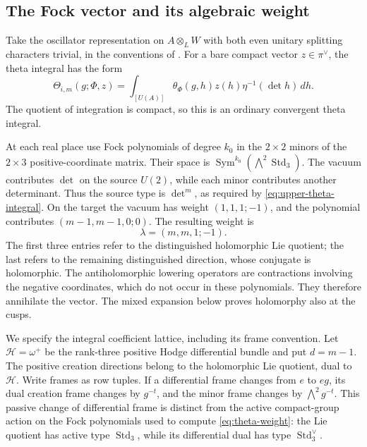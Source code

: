 \subsection{The Fock vector and its algebraic weight}

Take the oscillator representation on $A\otimes_L W$ with both even
unitary splitting characters trivial, in the conventions of
\cite{Kudla1994}.  For a bare compact vector $z\in\pi^\vee$, the theta
integral has the form
\begin{equation}\label{eq:upper-theta-integral}
 \Theta_{i,m}(g;\Phi,z)
 =\int_{[U(A)]}\theta_\Phi(g,h)z(h)\eta^{-1}(\det h)\,dh.
\end{equation}
The quotient of integration is compact, so this is an ordinary
convergent theta integral.

At each real place use Fock polynomials of degree $k_0$ in the
$2\times2$ minors of the $2\times3$ positive-coordinate matrix.  Their
space is
$\operatorname{Sym}^{k_0}(\bigwedge^2\operatorname{Std}_3)$.
The vacuum contributes $\det$ on the source $U(2)$, while each minor
contributes another determinant.  Thus the source type is $\det^m$, as
required by \eqref{eq:upper-theta-integral}.  On the target the vacuum has
weight $(1,1,1;-1)$, and the polynomial contributes
$(m-1,m-1,0;0)$.  The resulting weight is
\begin{equation}\label{eq:theta-weight}
 \lambda=(m,m,1;-1).
\end{equation}
The first three entries refer to the distinguished holomorphic Lie
quotient; the last refers to the remaining distinguished direction,
whose conjugate is holomorphic.  The antiholomorphic lowering operators
are contractions involving the negative coordinates, which do not occur
in these polynomials.  They therefore annihilate the vector.  The
mixed expansion below proves holomorphy also at the cusps.

We specify the integral coefficient lattice, including its frame
convention.  Let $\mathcal H=\omega^+$ be the rank-three positive
Hodge differential bundle and put $d=m-1$.  The positive creation
directions belong to the holomorphic Lie quotient, dual to
$\mathcal H$.  Write frames as row tuples.  If a differential frame
changes from $e$ to $eg$,
its dual creation frame changes by $g^{-t}$, and the minor frame changes
by $\bigwedge^2g^{-t}$.  This passive change of differential frame is
distinct from the active compact-group action on the Fock polynomials
used to compute \eqref{eq:theta-weight}: the Lie quotient has active
type $\operatorname{Std}_3$, while its differential dual has type
$\operatorname{Std}_3^\vee$.

